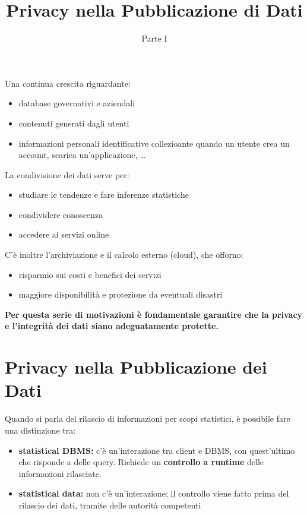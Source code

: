 \documentclass{report}
\title{Privacy nella Pubblicazione di Dati}
\date{Parte I}
\begin{document}
\maketitle

\tableofcontents

\newpage
Una continua crescita riguardante:
\begin{itemize}
    \item database governativi e aziendali
    \item contenuti generati dagli utenti 
    \item informazioni personali identificative collezioante quando un utente crea un account, scarica un'applicazione, \dots
\end{itemize}
La condivisione dei dati serve per:
\begin{itemize}
    \item studiare le tendenze e fare inferenze statistiche
    \item condividere conoscenza
    \item accedere ai servizi online
\end{itemize}
C'è inoltre l'archiviazione e il calcolo esterno (cloud), che offorno:
\begin{itemize}
    \item risparmio sui costi e benefici dei servizi
    \item maggiore disponibilità e protezione da eventuali disastri
\end{itemize}

\textbf{Per questa serie di motivazioni è fondamentale garantire che la privacy e l’integrità dei dati siano
adeguatamente protette.}

\chapter{Privacy nella Pubblicazione dei Dati}

Quando si parla del rilascio di informazioni per scopi statistici,
è possibile fare una distinzione tra:
\begin{itemize}
    \item \textbf{statistical DBMS:} c'è un'interazione tra client e DBMS, con quest'ultimo che risponde a delle query. Richiede un \textbf{controllo a runtime} delle informazioni rilasciate.
    \item \textbf{statistical data:} non c'è un'interazione; il controllo viene fatto prima del rilascio dei dati, tramite delle autorità competenti
\end{itemize}
\end{document}

